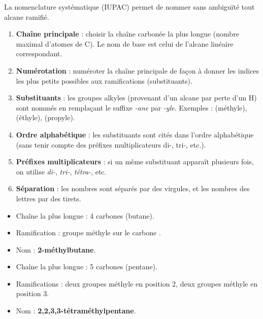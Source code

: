La nomenclature systématique (IUPAC) permet de nommer sans ambiguïté tout alcane ramifié.

\begin{regle}
\begin{enumerate}
    \item \textbf{Chaîne principale} : choisir la chaîne carbonée la plus longue (nombre maximal d'atomes de C). Le nom de base est celui de l'alcane linéaire correspondant.
    \item \textbf{Numérotation} : numéroter la chaîne principale de façon à donner les indices les plus petits possibles aux ramifications (substituants).
    \item \textbf{Substituants} : les groupes alkyles (provenant d'un alcane par perte d'un H) sont nommés en remplaçant le suffixe \textit{-ane} par \textit{-yle}. Exemples :  (méthyle),  (éthyle),  (propyle).
    \item \textbf{Ordre alphabétique} : les substituants sont cités dans l'ordre alphabétique (sans tenir compte des préfixes multiplicateurs di-, tri-, etc.).
    \item \textbf{Préfixes multiplicateurs} : si un même substituant apparaît plusieurs fois, on utilise \textit{di-}, \textit{tri-}, \textit{tétra-}, etc.
    \item \textbf{Séparation} : les nombres sont séparés par des virgules, et les nombres des lettres par des tirets.
\end{enumerate}
\end{regle}

\begin{exemple}
\begin{center}
\end{center}
\begin{itemize}
    \item Chaîne la plus longue : 4 carbones (butane).
    \item Ramification : groupe méthyle sur le carbone .
    \item Nom : \textbf{2-méthylbutane}.
\end{itemize}
\end{exemple}

\begin{exemple}
\begin{center}
\end{center}
\begin{itemize}
    \item Chaîne la plus longue : 5 carbones (pentane).
    \item Ramifications : deux groupes méthyle en position 2, deux groupes méthyle en position 3.
    \item Nom : \textbf{2,2,3,3-tétraméthylpentane}.
\end{itemize}
\end{exemple}

